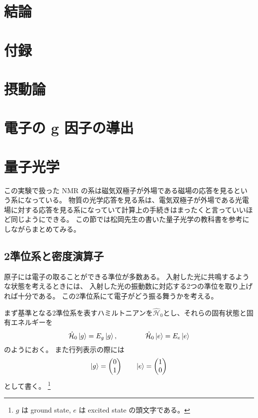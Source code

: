 \documentclass[11pt,dvipdfmx,a4paper]{jsarticle}
\begin{document}
\section{結論}





\section*{付録}
\section{摂動論}%

\section{電子の g 因子の導出}

\section{量子光学}
この実験で扱った NMR の系は磁気双極子が外場である磁場の応答を見るという系になっている。
物質の光学応答を見る系は、電気双極子が外場である光電場に対する応答を見る系になっていて計算上の手続きはまったくと言っていいほど同じようにできる。
この節では松岡先生の書いた量子光学の教科書\cite{Matsuoka_2000}を参考にしながらまとめてみる。
\subsection{2準位系と密度演算子}
原子には電子の取ることができる準位が多数ある。
入射した光に共鳴するような状態を考えるときには、
入射した光の振動数に対応する2つの準位を取り上げれば十分である。
この2準位系にて電子がどう振る舞うかを考える。

まず基準となる2準位系を表すハミルトニアンを\(\hat{\mathcal{H}}_0\)とし、それらの固有状態と固有エネルギーを
\begin{equation}
	\hat{\mathcal{H}}_0 \ket{g} = E_g \ket{g}, \qquad \qquad \hat{\mathcal{H}}_0 \ket{e} = E_e \ket{e}
\end{equation}
のようにおく。
また行列表示の際には
\begin{equation}
	\ket{g} =
	\begin{pmatrix}
		0\\
		1
	\end{pmatrix}
	\qquad
	\ket{e} =
	\begin{pmatrix}
		1 \\
		0
	\end{pmatrix}
\end{equation}
として書く。
\footnote{\(g\) は ground state, \(e\) は excited state の頭文字である。}
\end{document}
